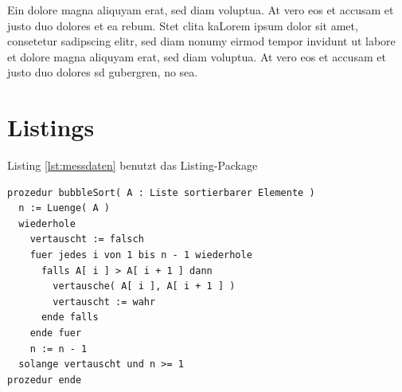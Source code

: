 \pagebreak
Ein 
dolore magna aliquyam erat, sed diam voluptua. At vero eos et accusam et justo duo dolores et ea rebum. Stet clita kaLorem ipsum dolor sit amet, consetetur sadipscing elitr, sed diam nonumy eirmod tempor invidunt ut labore et dolore magna aliquyam erat, sed diam voluptua. At vero eos et accusam et justo duo dolores sd gubergren, no sea.

\section{Listings}
Listing \ref{lst:messdaten} benutzt das Listing-Package

\begin{lstlisting}[caption=Ausschnitt aus Messung, label=lst:messdaten]
prozedur bubbleSort( A : Liste sortierbarer Elemente ) 
  n := Luenge( A )
  wiederhole
    vertauscht := falsch
    fuer jedes i von 1 bis n - 1 wiederhole 
      falls A[ i ] > A[ i + 1 ] dann
        vertausche( A[ i ], A[ i + 1 ] )
        vertauscht := wahr
      ende falls
    ende fuer
    n := n - 1
  solange vertauscht und n >= 1
prozedur ende
\end{lstlisting}
